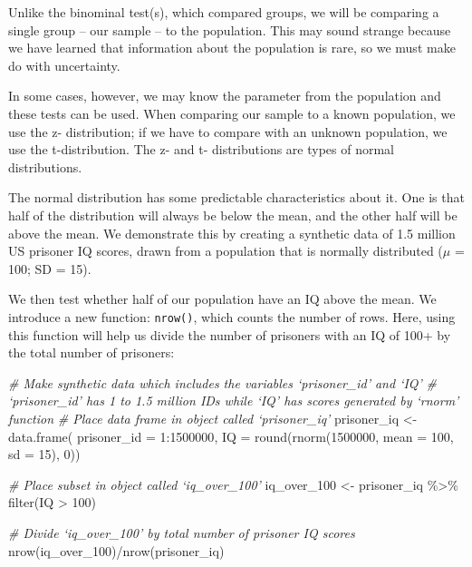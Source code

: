 \documentclass[
]{book}
\newenvironment{Shaded}{\begin{snugshade}}{\end{snugshade}}
\newcommand{\AttributeTok}[1]{\textcolor[rgb]{0.77,0.63,0.00}{#1}}
\newcommand{\CommentTok}[1]{\textcolor[rgb]{0.56,0.35,0.01}{\textit{#1}}}
\newcommand{\DecValTok}[1]{\textcolor[rgb]{0.00,0.00,0.81}{#1}}
\newcommand{\FunctionTok}[1]{\textcolor[rgb]{0.00,0.00,0.00}{#1}}
\newcommand{\NormalTok}[1]{#1}
\newcommand{\OtherTok}[1]{\textcolor[rgb]{0.56,0.35,0.01}{#1}}
\newcommand{\SpecialCharTok}[1]{\textcolor[rgb]{0.00,0.00,0.00}{#1}}
\begin{document}
Unlike the binominal test(s), which compared groups, we will be comparing a single group -- our sample -- to the population. This may sound strange because we have learned that information about the population is rare, so we must make do with uncertainty.

In some cases, however, we may know the parameter from the population and these tests can be used. When comparing our sample to a known population, we use the z- distribution; if we have to compare with an unknown population, we use the t-distribution. The z- and t- distributions are types of normal distributions.

The normal distribution has some predictable characteristics about it. One is that half of the distribution will always be below the mean, and the other half will be above the mean. We demonstrate this by creating a synthetic data of 1.5 million US prisoner IQ scores, drawn from a population that is normally distributed (\(\mu\) = 100; SD = 15).

We then test whether half of our population have an IQ above the mean. We introduce a new function: \texttt{nrow()}, which counts the number of rows. Here, using this function will help us divide the number of prisoners with an IQ of 100+ by the total number of prisoners:

\begin{Shaded}
\begin{Highlighting}[]
\CommentTok{\# Make synthetic data which includes the variables ‘prisoner\_id’ and ‘IQ’}
\CommentTok{\# ‘prisoner\_id’ has 1 to 1.5 million IDs while ‘IQ’ has scores generated by ‘rnorm’ function }
\CommentTok{\# Place data frame in object called ‘prisoner\_iq’}
\NormalTok{prisoner\_iq }\OtherTok{\textless{}{-}} \FunctionTok{data.frame}\NormalTok{( }\AttributeTok{prisoner\_id =} \DecValTok{1}\SpecialCharTok{:}\DecValTok{1500000}\NormalTok{, }\AttributeTok{IQ =} \FunctionTok{round}\NormalTok{(}\FunctionTok{rnorm}\NormalTok{(}\DecValTok{1500000}\NormalTok{, }\AttributeTok{mean =} \DecValTok{100}\NormalTok{, }\AttributeTok{sd =} \DecValTok{15}\NormalTok{), }\DecValTok{0}\NormalTok{)) }

\CommentTok{\# Place subset in object called ‘iq\_over\_100’}
\NormalTok{iq\_over\_100 }\OtherTok{\textless{}{-}}\NormalTok{ prisoner\_iq }\SpecialCharTok{\%\textgreater{}\%} \FunctionTok{filter}\NormalTok{(IQ }\SpecialCharTok{\textgreater{}} \DecValTok{100}\NormalTok{)}

\CommentTok{\# Divide ‘iq\_over\_100’ by total number of prisoner IQ scores}
\FunctionTok{nrow}\NormalTok{(iq\_over\_100)}\SpecialCharTok{/}\FunctionTok{nrow}\NormalTok{(prisoner\_iq)}
\end{Highlighting}
\end{Shaded}
\end{document}
